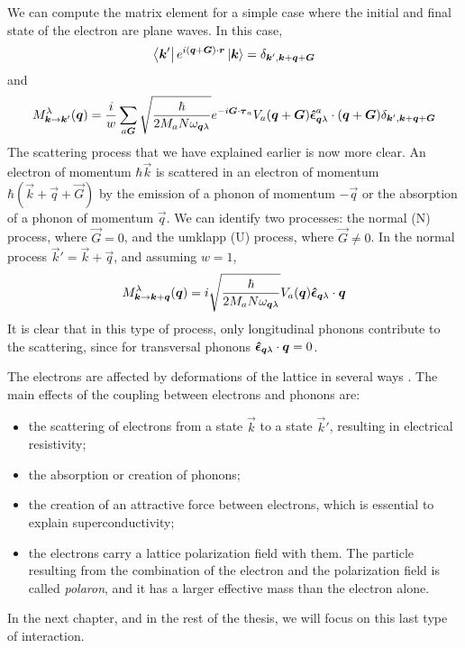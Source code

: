 We can compute the matrix element for a simple case where the initial and final state of the electron are plane waves. In this case,
\begin{equation} \label{eq:plane_waves}
    \bra{\mathbf{\boldsymbol{k}}'} e^{i(\mathbf{\boldsymbol{q}} + \mathbf{\boldsymbol{G}})\cdot \mathbf{\boldsymbol{r}}} \ket{\mathbf{\boldsymbol{k}}} = \delta_{\mathbf{\boldsymbol{k}}', \mathbf{\boldsymbol{k}}+\mathbf{\boldsymbol{q}}+\mathbf{\boldsymbol{G}}}
\end{equation}
and
\begin{equation}
    M_{\mathbf{\boldsymbol{k}} \rightarrow \mathbf{\boldsymbol{k}}'}^\lambda(\mathbf{\boldsymbol{q}}) =  \frac{i}{w} \sum_{a\mathbf{\boldsymbol{G}}} \sqrt{\frac{\hbar}{2M_aN\omega_{\mathbf{\boldsymbol{q}}\lambda}}}  e^{-i \mathbf{\boldsymbol{G}} \cdot \mathbf{\boldsymbol{\tau}}_a} V_a(\mathbf{\boldsymbol{q}} + \mathbf{\boldsymbol{G}}) \mathbf{\boldsymbol{\hat{\epsilon}}}_{\mathbf{\boldsymbol{q}}\lambda}^a \cdot (\mathbf{\boldsymbol{q}}+\mathbf{\boldsymbol{G}}) \delta_{\mathbf{\boldsymbol{k}}', \mathbf{\boldsymbol{k}}+\mathbf{\boldsymbol{q}}+\mathbf{\boldsymbol{G}}}
\end{equation}
The scattering process that we have explained earlier is now more clear. An electron of momentum $\hbar\vec{k}$ is scattered in an electron of momentum $\hbar (\vec{k}+\vec{q}+\vec{G})$ by the emission of a phonon of momentum $-\vec{q}$ or the absorption of a phonon of momentum $\vec{q}$. We can identify two processes: the normal (N) process, where $\vec{G} = 0$, and the umklapp (U) process, where $\vec{G} \neq 0$. In the normal process $\vec{k}' = \vec{k} + \vec{q}$, and assuming $w=1$,
\begin{equation} \label{eq:phonon_matrix_normal}
    M_{\mathbf{\boldsymbol{k}} \rightarrow \mathbf{\boldsymbol{k}} + \mathbf{\boldsymbol{q}}}^\lambda(\mathbf{\boldsymbol{q}}) =  i \sqrt{\frac{\hbar}{2M_aN\omega_{\mathbf{\boldsymbol{q}}\lambda}}}   V_a(\mathbf{\boldsymbol{q}}) \mathbf{\boldsymbol{\hat{\epsilon}}}_{\mathbf{\boldsymbol{q}}\lambda} \cdot \mathbf{\boldsymbol{q}}
\end{equation}
It is clear that in this type of process, only longitudinal phonons contribute to the scattering, since for transversal phonons $\mathbf{\boldsymbol{\hat{\epsilon}}}_{\mathbf{\boldsymbol{q}}\lambda} \cdot \mathbf{\boldsymbol{q}} = 0$.

The electrons are affected by deformations of the lattice in several ways \cite{kittel1987}. The main effects of the coupling between  electrons and phonons are:
\begin{itemize}
    \item the scattering of electrons from a state $\vec{k}$ to a state $\vec{k}'$, resulting in electrical resistivity;
    \item the absorption or creation of phonons;
    \item the creation of an attractive force between electrons, which is essential to explain superconductivity;
    \item the electrons carry a lattice polarization field with them. The particle resulting from the combination of the electron and the polarization field is called \emph{polaron}, and it has a larger effective mass than the electron alone.
\end{itemize}
In the next chapter, and in the rest of the thesis, we will focus on this last type of interaction.